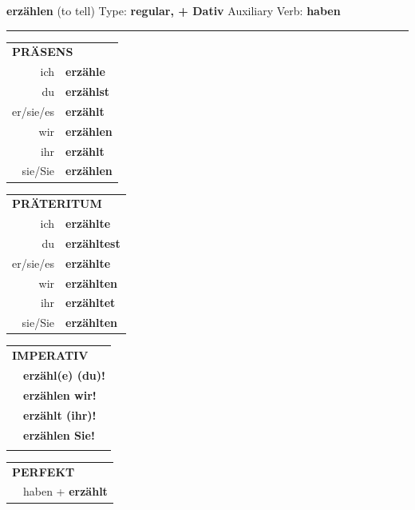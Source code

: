 \documentclass[10pt,a4paper]{revtex4-2}
\begin{document}
\begin{verbbox-dat}
    {\Large \bf erzählen} (to tell) \hfill Type: \textbf{regular, + Dativ} \hfill Auxiliary Verb: \textbf{haben} 
    
     \vspace{5pt}

    \hrule
    
    \vspace{5pt}

  \begin{tabular}{rl}
     \multicolumn{2}{l}{\textbf{PRÄSENS} }\\
    ich & \textbf{erzähle}\\
    du & \textbf{erzählst}\\
    er/sie/es & \textbf{erzählt}\\
    wir & \textbf{erzählen}\\
    ihr & \textbf{erzählt}\\
    sie/Sie & \textbf{erzählen}\\
  \end{tabular}
  \hfill
     \begin{tabular}{rl}
    \multicolumn{2}{l}{\textbf{PRÄTERITUM} }\\
    ich & \textbf{erzählte}\\
    du & \textbf{erzähltest}\\
    er/sie/es & \textbf{erzählte}\\
    wir & \textbf{erzählten}\\
    ihr & \textbf{erzähltet}\\
    sie/Sie & \textbf{erzählten}\\
  \end{tabular}
  \hfill
  \begin{tabular}{rl}
     \multicolumn{2}{l}{\textbf{IMPERATIV} }\\
   & \textbf{erzähl(e) (du)!}\\
   & \textbf{erzählen wir!}\\
   & \textbf{erzählt (ihr)!}\\
   & \textbf{erzählen Sie!}\\
   & \vspace{10pt}
  \end{tabular}

    \vspace{10pt}

 \begin{tabular}{rl}
     \multicolumn{2}{l}{\textbf{PERFEKT}}\\
  &  haben + \textbf{erzählt}\\
  \end{tabular}
\hfill
   \begin{tabular}{rl}
   

\end{tabular}
\end{verbbox-dat}
\end{document}
